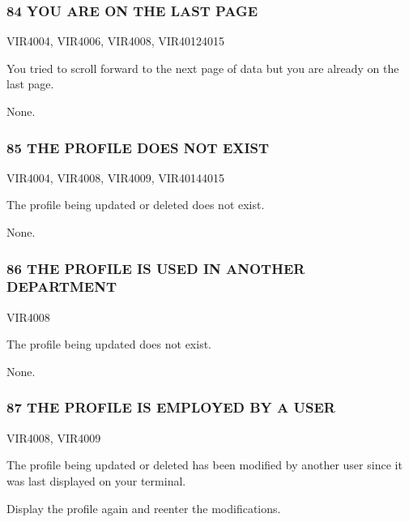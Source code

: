 \documentclass[letterpaper,10pt,english]{sphinxmanual}
\begin{document}
\subsubsection{84 YOU ARE ON THE LAST PAGE}
\label{\detokenize{messages:id5}}\begin{description}
\sphinxAtStartPar
VIR4004, VIR4006, VIR4008, VIR4012\sphinxhyphen{}4015

\sphinxAtStartPar
You tried to scroll forward to the next page of data but you are already on the last page.

\sphinxAtStartPar
None.

\end{description}


\subsubsection{85 THE PROFILE DOES NOT EXIST}
\label{\detokenize{messages:the-profile-does-not-exist}}\begin{description}
\sphinxAtStartPar
VIR4004, VIR4008, VIR4009, VIR4014\sphinxhyphen{}4015

\sphinxAtStartPar
The profile being updated or deleted does not exist.

\sphinxAtStartPar
None.

\end{description}


\subsubsection{86 THE PROFILE IS USED IN ANOTHER DEPARTMENT}
\label{\detokenize{messages:the-profile-is-used-in-another-department}}\begin{description}
\sphinxAtStartPar
VIR4008

\sphinxAtStartPar
The profile being updated does not exist.

\sphinxAtStartPar
None.

\end{description}


\subsubsection{87 THE PROFILE IS EMPLOYED BY A USER}
\label{\detokenize{messages:the-profile-is-employed-by-a-user}}\begin{description}
\sphinxAtStartPar
VIR4008, VIR4009

\sphinxAtStartPar
The profile being updated or deleted has been modified by another user since it was last displayed on your terminal.

\sphinxAtStartPar
Display the profile again and re\sphinxhyphen{}enter the modifications.

\end{description}
\end{document}
